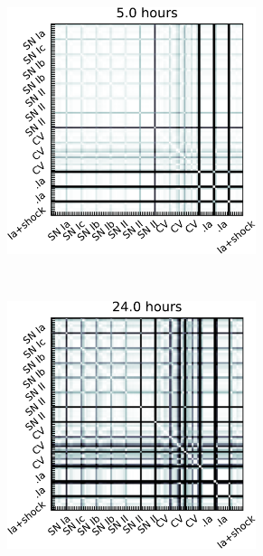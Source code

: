 \begin{figure}[hbt]
    \begin{subfigure}[t]{0.45\textwidth}
        \centering
        \includegraphics[width=0.8\textwidth]{figs/transients/TransientsAgeSimilarity3.pdf}
    \end{subfigure}%
    ~
    \begin{subfigure}[t]{0.45\textwidth}
        \centering
        \includegraphics[width=0.8\textwidth]{figs/transients/TransientsAgeSimilarity4.pdf}
    \end{subfigure}



\end{figure}
